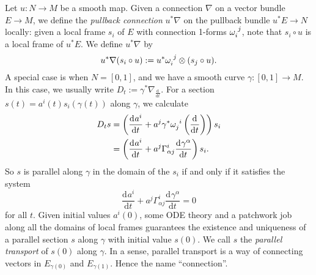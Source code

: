 \documentclass{book}
\renewcommand{\d}{\mathrm{d}}
\newcommand{\parens}[1]{\left( {#1} \right)}
\newcommand{\odv}[3][]{\frac{\d^{#1}#2}{\d{#3}^{#1}}}
\theoremstyle{definition}
\numberwithin{equation}{section}
\begin{document}
Let $u \colon N \to M$ be a smooth map. Given a connection $\nabla$ on a vector bundle $E \to M$, we define the \textit{pullback connection} $u^*\nabla$ on the pullback bundle $u^*E \to N$ locally: given a local frame $s_i$ of $E$ with connection 1-forms $\tensor{\omega}{_i^j}$, note that $s_i \circ u$ is a local frame of $u^*E$. We define $u^*\nabla$ by 
\begin{equation}
    u^*\nabla (s_i \circ u) := u^*\tensor{\omega}{_i^j} \otimes (s_j \circ u).
\end{equation}
A special case is when $N = [0,1]$, and we have a smooth curve $\gamma \colon [0,1] \to M$. In this case, we usually write $D_t := \gamma^* \nabla_{\odv{}{t}}$. For a section $s(t) = a^i(t) s_i(\gamma(t))$ along $\gamma$, we calculate
\begin{equation} \begin{aligned}
    D_t s &= \parens{ \odv{a^i}{t} + a^j \gamma^*\tensor{\omega}{_j^i}\parens{\odv{}{t}} } s_i \\
          &= \parens{ \odv{a^i}{t} + a^j \Gamma_{\alpha j}^i \odv{\gamma^\alpha}{t} } s_i.
\end{aligned} \end{equation}
So $s$ is parallel along $\gamma$ in the domain of the $s_i$ if and only if it satisfies the system
\begin{equation}
    \odv{a^i}{t} + a^j \Gamma_{\alpha j}^i \odv{\gamma^\alpha}{t} = 0
\end{equation}
for all $t$. Given initial values $a^i(0)$, some ODE theory and a patchwork job along all the domains of local frames guarantees the existence and uniqueness of a parallel section $s$ along $\gamma$ with initial value $s(0)$. We call $s$ the \textit{parallel transport} of $s(0)$ along $\gamma$.
In a sense, parallel transport is a way of connecting vectors in $E_{\gamma(0)}$ and $E_{\gamma(1)}$. Hence the name ``connection''.
\end{document}
